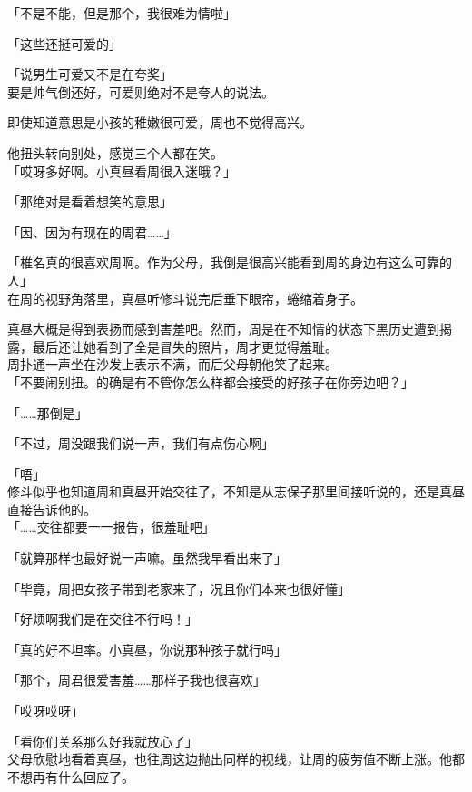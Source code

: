 「不是不能，但是那个，我很难为情啦」

「这些还挺可爱的」

「说男生可爱又不是在夸奖」\\

要是帅气倒还好，可爱则绝对不是夸人的说法。

即使知道意思是小孩的稚嫩很可爱，周也不觉得高兴。

他扭头转向别处，感觉三个人都在笑。\\

「哎呀多好啊。小真昼看周很入迷哦？」

「那绝对是看着想笑的意思」

「因、因为有现在的周君……」%

「椎名真的很喜欢周啊。作为父母，我倒是很高兴能看到周的身边有这么可靠的人」\\

在周的视野角落里，真昼听修斗说完后垂下眼帘，蜷缩着身子。

真昼大概是得到表扬而感到害羞吧。然而，周是在不知情的状态下黑历史遭到揭露，最后还让她看到了全是冒失的照片，周才更觉得羞耻。\\

周扑通一声坐在沙发上表示不满，而后父母朝他笑了起来。\\

「不要闹别扭。的确是有不管你怎么样都会接受的好孩子在你旁边吧？」

「……那倒是」

「不过，周没跟我们说一声，我们有点伤心啊」

「唔」\\

修斗似乎也知道周和真昼开始交往了，不知是从志保子那里间接听说的，还是真昼直接告诉他的。\\

「……交往都要一一报告，很羞耻吧」

「就算那样也最好说一声嘛。虽然我早看出来了」

「毕竟，周把女孩子带到老家来了，况且你们本来也很好懂」

「好烦啊我们是在交往不行吗！」

「真的好不坦率。小真昼，你说那种孩子就行吗」

「那个，周君很爱害羞……那样子我也很喜欢」

「哎呀哎呀」

「看你们关系那么好我就放心了」\\

父母欣慰地看着真昼，也往周这边抛出同样的视线，让周的疲劳值不断上涨。他都不想再有什么回应了。\\


